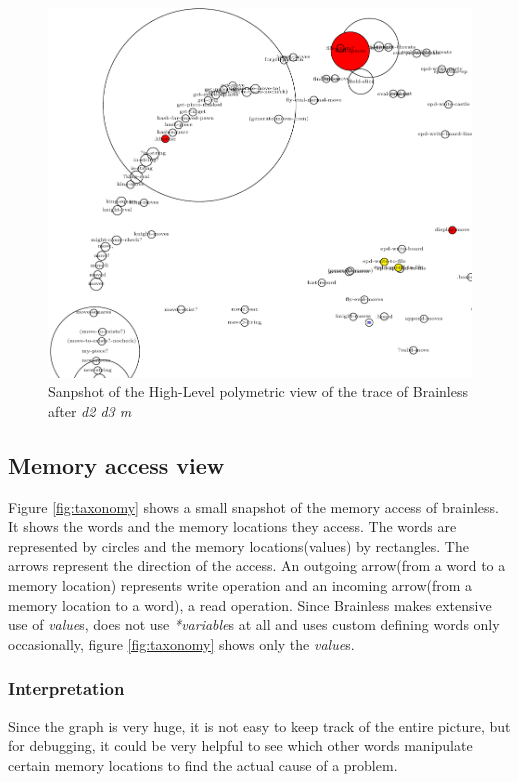 \begin{figure}[p]
    \centering
    \includegraphics[scale=0.5]{graphics/polymetric_view_detail.png}
    \caption{Sanpshot of the High-Level polymetric view of the trace of Brainless after \emph{d2 d3 m}}
    \label{fig:polymetric_view_detail}
\end{figure}

\subsection*{Memory access view}

Figure \ref{fig:taxonomy} shows a small snapshot of the memory access of brainless.
It shows the words and the memory locations they access. The words are represented by circles and the memory locations(values) by rectangles. The arrows represent the direction of the access. An outgoing arrow(from a word to a memory location) represents write operation and an incoming arrow(from a memory location to a word), a read operation.
Since Brainless makes extensive use of \emph{value}s, does not use \emph{*variable}s at all and uses custom defining words only occasionally,  figure \ref{fig:taxonomy} shows only the \emph{value}s.

\subsubsection*{Interpretation}

Since the graph is very huge, it is not easy to keep track of the entire picture, but for debugging, it could be very helpful to see which other words manipulate certain memory locations to find the actual cause of a problem.

